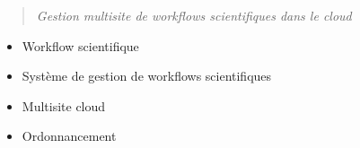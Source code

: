 \begin{quote}
  \textit{Gestion multisite de workflows scientifiques dans le cloud}
  
 
\end{quote}


\begin{itemize}
 \item Workflow scientifique
 \item Système de gestion de workflows scientifiques
 \item Multisite cloud 
 \item Ordonnancement
   
\end{itemize}